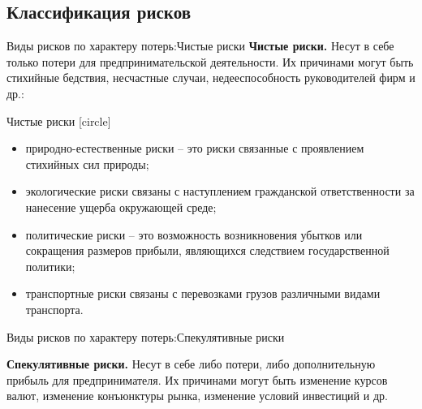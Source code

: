 \documentclass[_fin_decisions_lectures.tex]{subfiles}
\begin{document}
\subsection{Классификация рисков}

\begin{frame}[shrink=10]{Виды рисков по характеру потерь:}{Чистые риски}
	\textbf{Чистые риски.} Несут в себе только потери для предпринимательской деятельности. Их причинами могут быть стихийные бедствия, несчастные случаи, недееспособность руководителей фирм и др.:
\end{frame}

\begin{frame}[ allowframebreaks ]{Чистые риски}
	[circle]
\begin{itemize}
	\item природно-естественные риски – это риски связанные с проявлением стихийных сил природы;
	\item экологические риски связаны с наступлением гражданской ответственности за нанесение ущерба окружающей среде;
	\pagebreak
	\item политические риски – это возможность возникновения убытков или сокращения размеров прибыли, являющихся следствием государственной политики;
	\item транспортные риски связаны с перевозками грузов различными видами транспорта.
\end{itemize}  
\end{frame}

\begin{frame}{Виды рисков по характеру потерь:}{Спекулятивные риски}
\begin{block}{\textbf{Спекулятивные риски.}}
Несут в себе либо потери, либо дополнительную прибыль для предпринимателя. Их причинами могут быть изменение курсов валют, изменение конъюнктуры рынка, изменение условий инвестиций и др.
\end{block}
\end{frame}
\end{document}
